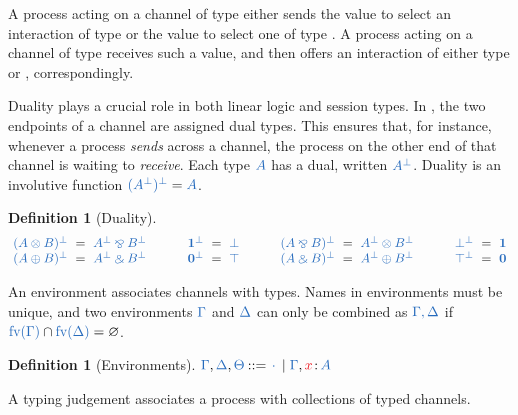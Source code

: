 \documentclass[submission,copyright,creativecommons]{eptcs}
\def\Coloneqq{\mathbin{::=}}
\newtheorem{definition}[lemma]{Definition}
\begin{document}
A process acting on a channel of type  either sends the value  to select an interaction of type  or the value  to select one of type . 
A process acting on a channel of type  receives such a value, and then offers an interaction of either type  or , correspondingly.

Duality plays a crucial role in both linear logic and session types. In \cp, the two endpoints of a channel are assigned dual types. This ensures that, for instance, whenever a process \emph{sends} across a channel, the process on the other end of that channel is waiting to \emph{receive}. Each type $\ty{A}$ has a dual, written $\ty{A^\bot}$. Duality is an involutive function \ie $\ty{(A^\bot)^\bot} = \ty{A}$.
\begin{definition}[Duality]\label{def:cp-negation}
  \[
    \setlength{\arraycolsep}{3pt}
    \begin{array}{lclclclclclclcl}
               \ty{(A \tens B)^\bot} & = & \ty{A^\bot \parr B^\bot}
      &\qquad& \ty{\one^\bot}        & = & \ty{\bot}
      &\qquad& \ty{(A \parr B)^\bot} & = & \ty{A^\bot \tens B^\bot}
      &\qquad& \ty{\bot^\bot}        & = & \ty{\one}
      \\       \ty{(A \plus B)^\bot} & = & \ty{A^\bot \with B^\bot}
      &\qquad& \ty{\nil^\bot}        & = & \ty{\top}
      &\qquad& \ty{(A \with B)^\bot} & = & \ty{A^\bot \plus B^\bot}
      &\qquad& \ty{\top^\bot}        & = & \ty{\nil}
    \end{array}
  \]
\end{definition}\noindent
An environment associates channels with types. Names in environments must be unique, and two environments $\ty{\Gamma}$ and $\ty{\Delta}$ can only be combined as $\ty{\Gamma, \Delta}$ if $\ty{\fv{\Gamma}} \cap \ty{\fv{\Delta}} = \varnothing$.
\begin{definition}[Environments]\label{def:cp-environments}
  \(
    \ty{\Gamma}, \ty{\Delta}, \ty{\Theta} \Coloneqq \ty{\emptycontext} \mid \ty{\Gamma}, \tmty{x}{A}
  \)
\end{definition}\noindent
A typing judgement associates a process with collections of typed channels.
\end{document}
